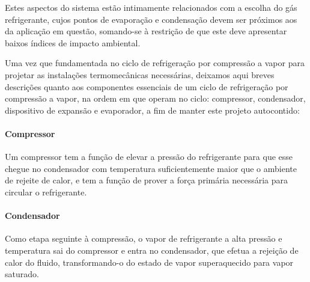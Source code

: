 \documentclass[10pt,a4paper]{article}
\begin{document}
Estes aspectos do sistema estão intimamente relacionados com a escolha do gás refrigerante, cujos pontos de evaporação e condensação devem ser próximos aos da aplicação em questão, somando-se à restrição de que este deve apresentar baixos índices de impacto ambiental.

Uma vez que fundamentada no ciclo de refrigeração por compressão a vapor para projetar as instalações termomecânicas necessárias, deixamos aqui breves descrições quanto aos componentes essenciais de um ciclo de refrigeração por compressão a vapor, na ordem em que operam no ciclo: compressor, condensador, dispositivo de expansão e evaporador, a fim de manter este projeto autocontido:

\paragraph{{ Compressor}}
Um compressor tem a função de elevar a pressão do refrigerante para que esse chegue no condensador com temperatura suficientemente maior que o ambiente de rejeite de calor, e tem a função de prover a força primária necessária para circular o refrigerante. %
%

\paragraph*{{ Condensador}}
Como etapa seguinte à compressão, o vapor de refrigerante a alta pressão e temperatura sai do compressor e entra no condensador, que efetua a rejeição de calor do fluido, transformando-o do estado de vapor superaquecido para vapor saturado. %
\end{document}
